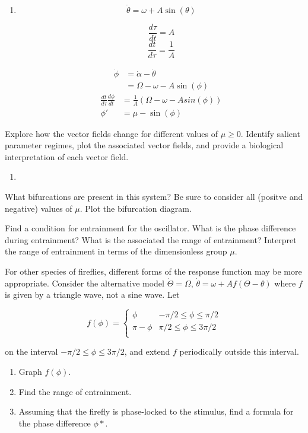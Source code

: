 \documentclass[12pt]{article}
\begin{document}
\begin{enumerate}
    \item 
    $$
    \dot{\theta} = \omega + A\sin(\theta)
    $$

    $$
    \frac{d\tau}{dt} = A
    $$
    $$
    \frac{dt}{d\tau} = \frac{1}{A}
    $$

    \begin{align*}
        \dot{\phi} &= \dot{\alpha} - \dot{\theta} \\
        &= \Omega - \omega - A\sin(\phi) 
    \end{align*}
    \begin{align*}
        \frac{dt}{d\tau} \frac{d\phi}{dt} &= \frac{1}{A} \left( \Omega - \omega - Asin(\phi) \right) \\
        \phi' &= \mu - \sin(\phi)
    \end{align*}
\end{enumerate}

\vspace{.2in}
Explore how the vector fields change for different values of $\mu \ge 0$. Identify salient parameter regimes, plot the associated vector fields, and provide a biological interpretation of each vector field.
\vspace{.2in} 
\begin{enumerate}
    \item 
\end{enumerate}


What bifurcations are present in this system? Be sure to consider all (positve and negative) values of $\mu$. Plot the bifurcation diagram.

\vspace{.2in}
Find a condition for entrainment for the oscillator. What is the phase difference during entrainment? What is the associated the range of entrainment? Interpret the range of entrainment in terms of the dimensionless group $\mu$.


\vspace{.2in}
For other species of fireflies, different forms of the response function may be more appropriate. Consider the alternative model $\dot{\Theta}=\Omega$, $\dot{\theta}=\omega+Af(\Theta - \theta)$ where $f$ is given by a triangle wave, not a sine wave. Let

\[ f(\phi) = \begin{cases} 
      \phi& -\pi/2 \leq \phi \leq \pi/2 \\
      \pi - \phi & \pi/2\leq \phi \leq 3\pi/2 \\
   \end{cases}
\]

on the interval $-\pi/2 \leq \phi \leq 3\pi/2$, and extend $f$ periodically outside this interval.

\begin{enumerate}
\item Graph $f(\phi)$.
\item Find the range of entrainment.
\item Assuming that the firefly is phase-locked to the stimulus, find a formula for the phase difference $\phi*$.
\end{enumerate}
\end{document}
